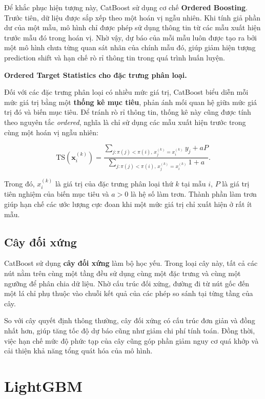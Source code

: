 \documentclass[a4paper]{report}
\begin{document}
Để khắc phục hiện tượng này, CatBoost sử dụng cơ chế
\textbf{Ordered Boosting}. Trước tiên, dữ liệu được sắp xếp theo một hoán vị
ngẫu nhiên. Khi tính giả phần dư của một mẫu, mô hình chỉ được phép sử dụng
thông tin từ các mẫu xuất hiện trước mẫu đó trong hoán vị. Nhờ vậy, dự báo của
mỗi mẫu luôn được tạo ra bởi một mô hình chưa từng quan sát nhãn của chính mẫu
đó, giúp giảm hiện tượng prediction shift và hạn chế rò rỉ thông tin trong quá
trình huấn luyện.

\medskip
\noindent\textbf{Ordered Target Statistics cho đặc trưng phân loại.}

Đối với các đặc trưng phân loại có nhiều mức giá trị, CatBoost biểu diễn mỗi
mức giá trị bằng một \textbf{thống kê mục tiêu}, phản ánh
mối quan hệ giữa mức giá trị đó và biến mục tiêu. Để tránh rò rỉ thông tin,
thống kê này cũng được tính theo nguyên tắc \textit{ordered}, nghĩa là chỉ sử
dụng các mẫu xuất hiện trước trong cùng một hoán vị ngẫu nhiên:

\[
  \text{TS}(\mathbf{x}_i^{(k)}) =
  \frac{\displaystyle
  \sum_{j:\pi(j)<\pi(i),\,x_j^{(k)}=x_i^{(k)}}y_j
  + aP}
  {\displaystyle
  \sum_{j:\pi(j)<\pi(i),\,x_j^{(k)}=x_i^{(k)}}1
  + a}.
\]

Trong đó, $x_i^{(k)}$ là giá trị của đặc trưng phân loại thứ $k$ tại mẫu $i$,
$P$ là giá trị tiên nghiệm của biến mục tiêu và $a>0$ là hệ số làm trơn. Thành
phần làm trơn giúp hạn chế các ước lượng cực đoan khi một
mức giá trị chỉ xuất hiện ở rất ít mẫu.

\subsection{Cây đối xứng}

CatBoost sử dụng \textbf{cây đối xứng} làm bộ học yếu. Trong loại cây này, tất
cả các nút nằm trên cùng một tầng đều sử dụng cùng một đặc
trưng và cùng một ngưỡng để phân chia dữ liệu. Nhờ cấu trúc đối xứng, đường đi
từ nút gốc đến một lá chỉ phụ thuộc vào chuỗi kết quả của các phép so sánh tại
từng tầng của cây.

So với cây quyết định thông thường, cây đối xứng có cấu trúc đơn giản và đồng
nhất hơn, giúp tăng tốc độ dự báo cũng như giảm chi phí tính toán. Đồng thời,
việc hạn chế mức độ phức tạp của cây cũng góp phần giảm nguy cơ quá khớp và cải
thiện khả năng tổng quát hóa của mô hình.

\section{LightGBM}
\end{document}
